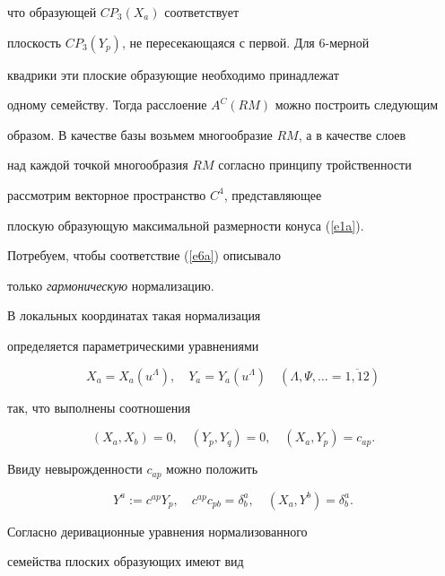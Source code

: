 что образующей $CP_3(X_a)$ соответствует


плоскость $CP_3(Y_p)$, не пересекающаяся с первой. Для 6-мерной


квадрики эти плоские образующие необходимо принадлежат


одному семейству. Тогда расслоение $A^C(RM)$ можно построить следующим


образом. В качестве базы возьмем многообразие $RM$, а в качестве слоев


над каждой точкой многообразия $RM$ согласно принципу тройственности


рассмотрим векторное пространство $C^4$, представляющее


плоскую образующую максимальной размерности конуса (\ref{e1a}).


Потребуем, чтобы соответствие (\ref{e6a}) описывало


только {\it гармоническую} нормализацию.


В локальных координатах такая нормализация


определяется параметрическими уравнениями


\begin{equation}


\label{e7a}


X_a=X_a(u^\Lambda ),\quad Y_a=Y_a(u^\Lambda )\quad


(\Lambda,\Psi,\dotsc=\overline{1,12})


\end{equation}


так, что выполнены соотношения


\begin{equation}


\label{e8a}


(X_a,X_b)=0,\quad (Y_p,Y_q)=0,\quad (X_a,Y_p)=c_{ap}.


\end{equation}


Ввиду невырожденности $c_{ap}$ можно положить


\begin{equation}


\label{e9a}


Y^a:=c^{ap}Y_p,\quad c^{ap}c_{pb}=\delta_b^a,\quad (X_a,Y^b)=\delta_b^a.


\end{equation}


Согласно \cite{1} деривационные уравнения нормализованного


семейства плоских образующих имеют вид


